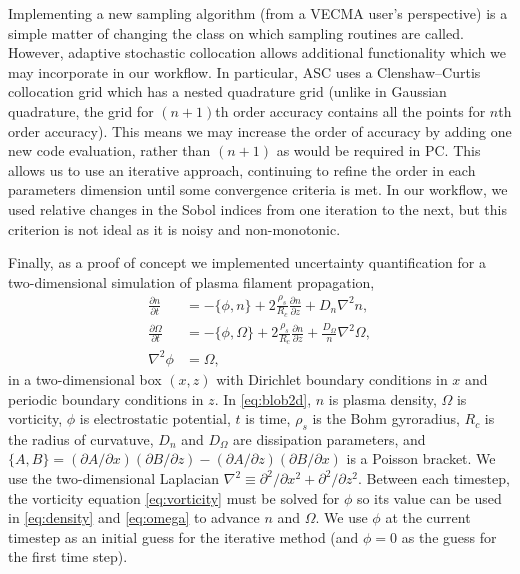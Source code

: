 Implementing a new sampling algorithm (from a VECMA user's perspective) is a
simple matter of changing the class on which sampling routines are called.
However, adaptive stochastic collocation allows additional functionality which
we may incorporate in our workflow.
In particular, ASC uses a Clenshaw--Curtis collocation grid which has a nested
quadrature grid (unlike in Gaussian quadrature, the grid for $(n+1)$th order
accuracy contains all the points for $n$th order accuracy).
This means we may increase the order of accuracy by adding one new code
evaluation, rather than $(n+1)$ as would be required in PC.
This allows us to use an iterative approach, continuing to refine the order in
each parameters dimension until some convergence criteria is met.
In our workflow, we used relative changes in the Sobol indices from one
iteration to the next, but this criterion is not ideal as it is noisy and
non-monotonic.

\newcommand{\pd}[2]{\frac{\partial #1}{\partial #2}}
\newcommand{\tpd}[2]{\partial #1/\partial #2}
\newcommand{\tpdd}[2]{\partial^2 #1/\partial #2^2}
Finally, as a proof of concept we implemented uncertainty quantification for
a two-dimensional simulation of plasma filament propagation, 
\begin{subequations}
\label{eq:blob2d}
\begin{align}
	\pd{n}{t} &= -\{\phi, n\} + 2\frac{\rho_s}{R_c} \pd{n}{z} %
	              + D_n \nabla^2n,  \label{eq:density} \\ %
\pd{\Omega}{t} &= -\{\phi, \Omega\} + 2\frac{\rho_s}{R_c} \pd{n}{z} %
		+ \frac{D_{\Omega}}{n} \nabla^2 \Omega,  \label{eq:omega} \\%
\nabla^2 \phi &= \Omega, \label{eq:vorticity}
\end{align}
\end{subequations}
in a two-dimensional box $(x,z)$ with Dirichlet boundary conditions in $x$ and periodic boundary conditions in $z$.
In \eqref{eq:blob2d}, $n$ is plasma density, $\Omega$ is vorticity, $\phi$ is
electrostatic potential, $t$ is time,
$\rho_s$ is the Bohm gyroradius,
$R_c$ is the radius of curvatuve,
$D_n$ and $D_{\Omega}$ are dissipation parameters,
and
$\{A,B\} = (\tpd{A}{x})(\tpd{B}{z}) - (\tpd{A}{z})(\tpd{B}{x})$ is a Poisson bracket.
We use the two-dimensional Laplacian $\nabla^2 \equiv \tpdd{}{x}+\tpdd{}{z}$.
Between each timestep, the vorticity equation \eqref{eq:vorticity} must be solved for $\phi$ so its value can be used in \eqref{eq:density} and \eqref{eq:omega} to advance $n$ and $\Omega$.
We use $\phi$ at the current timestep as an initial guess for the iterative method (and $\phi=0$ as the guess for the first time step).

